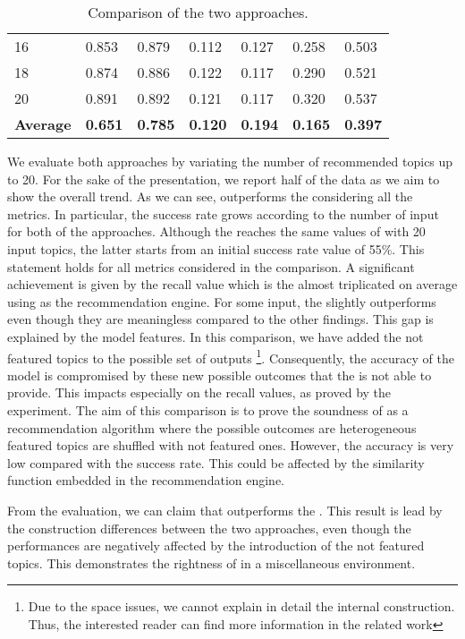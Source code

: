 \begin{table}[]
{\begin{tabular}{|l|l|l|l|l|l|l|}
		16                      & 0.853               & 0.879              & 0.112               & 0.127              & 0.258               & 0.503              \\
		18                      & 0.874               & 0.886              & 0.122               & 0.117              & 0.290               & 0.521              \\
		20                      & 0.891               & 0.892              & 0.121               & 0.117              & 0.320               & 0.537              \\ \hline
		\rowcolor[HTML]{C0C0C0} 
		\textbf{Average} & \textbf{0.651}      & \textbf{0.785}     & \textbf{0.120}      & \textbf{0.194}     & \textbf{0.165}      & \textbf{0.397}    \\ \hline
	\end{tabular}}
\caption{Comparison of the two approaches.}
\label{tab:compareMNB}
\end{table}
We evaluate both approaches by variating the number of recommended topics up to 20. For the sake of the presentation, we report half of the data as we aim to show the overall trend.
As we can see, \CT outperforms the \MNB considering all the metrics. In particular, the success rate grows according to the number of input for both of the approaches. Although the \MNB reaches the same values of \CT with 20 input topics, the latter starts from an initial success rate value of 55\%. This statement holds for all metrics considered in the comparison. A significant achievement is given by the recall value which is the almost triplicated on average using \CT as the recommendation engine. For some input, the \MNB slightly outperforms \CT even though they are meaningless compared to the other findings. 
This gap is explained by the \MNB model features. In this comparison, we have added the not featured topics to the possible set of outputs \footnote{Due to the space issues, we cannot explain in detail the \MNB internal construction. Thus, the interested reader can find more information in the related work}. Consequently, the accuracy of the model is compromised by these new possible outcomes that the \MNB is not able to provide. This impacts especially on the recall values, as proved by the experiment. The aim of this comparison is to prove the soundness of \CT as a recommendation algorithm where the possible outcomes are heterogeneous \ie featured topics are shuffled with not featured ones. However, the accuracy is very low compared with the success rate. This could be affected by the similarity function embedded in the recommendation engine. 


\begin{tcolorbox}[boxrule=0.86pt,left=0.3em, right=0.3em,top=0.1em, bottom=0.05em]
From the evaluation, we can claim that \CT outperforms the \MNB. This result is lead by the construction differences between the two approaches, even though the \MNB performances are negatively affected by the introduction of the not featured topics. This demonstrates the rightness of \CT in a miscellaneous environment. 
\end{tcolorbox}